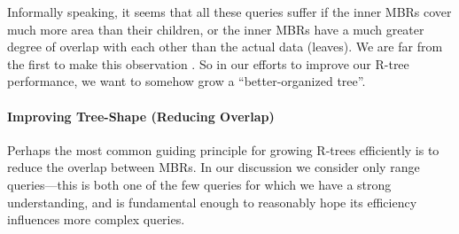 Informally speaking, it seems that all these queries suffer if the inner MBRs cover much more area than their children, or the inner MBRs have a much greater degree of overlap with each other than the actual data (leaves).
We are far from the first to make this observation \cite{gaedegunther98}.
So in our efforts to improve our R-tree performance, we want to somehow grow a ``better-organized tree''.





\paragraph{Improving Tree-Shape (Reducing Overlap)}
Perhaps the most common guiding principle for growing R-trees efficiently is to reduce the overlap between MBRs.
In our discussion we consider only range queries---this is both one of the few queries for which we have a strong understanding, and is fundamental enough to reasonably hope its efficiency influences more complex queries.

